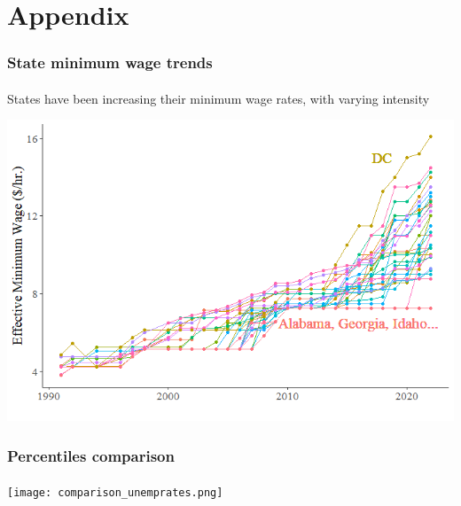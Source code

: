 
\section{Appendix}

\begin{frame}

    \label{min_wage_plot_allstates}
    
    \frametitle{State minimum wage trends} %
    \framesubtitle{}  %
    \rmfamily %
    
    \begin{wideitemize}
        \item States have been increasing their \textcolor{fblu}{minimum wage rates}, with varying intensity
    \end{wideitemize}

    \begin{center}
        \includegraphics[scale=0.5]{min_wage_plot.png}
    \end{center}
    
    \hyperlink{Minimum Wage}{}
    
\end{frame}

\begin{frame}

    \label{perc_comparison_1}
    
    \frametitle{Percentiles comparison} %
    \framesubtitle{}  %
    \rmfamily %

    \begin{center}
        \texttt{[image: comparison\_unemprates.png]}
    \end{center}
    
    \hyperlink{unemp_rate_result}{}
    
\end{frame}

